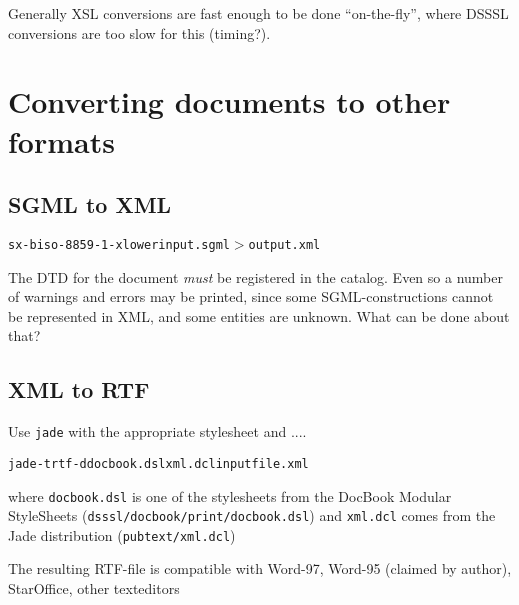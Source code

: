 Generally XSL conversions are fast enough to be done ``on-the-fly'',
where DSSSL conversions are \textsf{too slow for this (timing?)}.



\section{Converting documents to other formats}
\label{sec:docbook-converting-documents-to-other-formats}


\subsection{SGML to XML}
\label{docbook-converting-sgml-to-xml}

\begin{alltt}
  sx -biso-8859-1 -xlower input.sgml $>$ output.xml
\end{alltt}

The DTD for the document \textit{must} be registered in the
\textsf{catalog}.  Even so a number of warnings and errors may be
printed, since some SGML-constructions cannot be represented in XML,
and some entities are unknown.  \textsf{What can be done about that?}


\subsection{XML to RTF}
\label{sec:docbook-xml-to-rtf}

Use \texttt{jade} with the appropriate stylesheet and \textsf{....}

\begin{alltt}
         jade -t rtf -d docbook.dsl xml.dcl inputfile.xml
\end{alltt}

where \texttt{docbook.dsl} is one of the stylesheets from the
\textsf{DocBook Modular StyleSheets}
(\texttt{dsssl/docbook/print/docbook.dsl}) and \texttt{xml.dcl} comes
from the Jade distribution (\texttt{pubtext/xml.dcl})

The resulting RTF-file is compatible with Word-97, Word-95 (claimed by
author), StarOffice, \textsf{other texteditors} 



